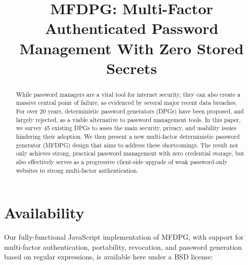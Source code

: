 \documentclass[conference]{IEEEtran}
\begin{document}
\title{MFDPG: Multi-Factor Authenticated Password Management With Zero Stored Secrets}

\author{
\and
{}
}

\IEEEoverridecommandlockouts
\makeatletter{}\makeatother
{}

\maketitle

\begin{abstract}
While password managers are a vital tool for internet security, they can also create a massive central point of failure, as evidenced by several major recent data breaches.
For over 20 years, deterministic password generators (DPGs) have been proposed, and largely rejected, as a viable alternative to password management tools. In this paper, we survey 45 existing DPGs to asses the main security, privacy, and usability issues hindering their adoption. We then present a new multi-factor deterministic password generator (MFDPG) design that aims to address these shortcomings.
The result not only achieves strong, practical password management with zero credential storage, but also effectively serves as a progressive client-side upgrade of weak password-only websites to strong multi-factor authentication.
\end{abstract}










\section*{Availability}
Our fully-functional JavaScript implementation of MFDPG, with support for multi-factor authentication, portability, revocation, and password generation based on regular expressions, is available here under a BSD license:\\
\end{document}
